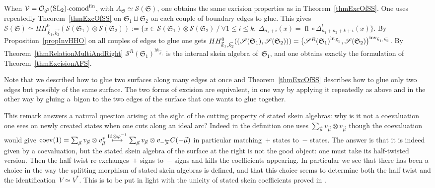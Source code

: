 \documentclass[pdftex]{sigma}%
\numberwithin{equation}{section}
\newcommand{\halft}{{\operatorname{ht}}}
\newcommand{\Oqcomfin}{\Oq\text{-}{\rm comod}^{\rm fin}}
\newcommand{\Oq}{\mathcal{O}_{q^2}({\rm SL}_2)}
\begin{document}
\begin{Remark}
When $\mathcal{V} = \Oqcomfin$, with $A_\mathfrak{S} \simeq \mathscr{S}(\mathfrak{S})$, one obtains the same excision properties as in Theorem~\ref{thmExcOfSS}. One uses repeatedly Theorem~\ref{thmExcOfSS} on $\mathfrak{S}_1\sqcup\mathfrak{S}_2$ on each couple of boundary edges to glue. This gives $\mathscr{S}(\mathfrak{S}) \simeq HH^0_{\vec{k}_1,\vec{k_2}}(\mathscr{S}(\mathfrak{S}_1)\otimes \mathscr{S}(\mathfrak{S}_2)):= \{ x \in \mathscr{S}(\mathfrak{S}_1) \otimes \mathscr{S}(\mathfrak{S}_2)\ /\ \forall 1\leq i\leq k,\ \Delta_{n_1+i}(x) = \operatorname{fl}\circ \Delta^l_{n_1+n_2+k+i}(x)\}$. By Proposition~\ref{propInvHHO} on all couples of edges to glue one gets $HH^0_{\vec{k}_1,\vec{k_2}}((\mathscr{S}(\mathfrak{S}_1), \mathscr{S}(\mathfrak{S}_2)))= \big(\mathscr{S}^R(\mathfrak{S}_1)^{\halft_{\vec{k}_1}} , \mathscr{S}(\mathfrak{S}_2)\big)^{{\rm inv}_{\vec{k}_1,\vec{k_2}}}$. By Theorem~\ref{thmRelationMultiAndRight} $\mathscr{S}^R(\mathfrak{S}_1)^{\halft_{\vec{k}_1}}$ is the internal skein algebra of~$\mathfrak{S}_1$, and one obtains exactly the formulation of Theorem~\ref{thmExcisionAFS}.

Note that we described how to glue two surfaces along many edges at once and Theorem~\ref{thmExcOfSS} describes how to glue only two edges but possibly of the same surface. The two forms of excision are equivalent, in one way by applying it repeatedly as above and in the other way by gluing a~bigon to the two edges of the surface that one wants to glue together.
\end{Remark}

\begin{Remark}\label{rmkChoiceCutting}
This remark answers a natural question arising at the sight of the cutting property of stated skein algebras: why is it not a coevaluation one sees on newly created states when one cuts along an ideal arc? Indeed in the definition one uses $\sum_{\vec{\mu}} v_{\vec{\mu}}\otimes v_{\vec{\mu}}$ though the coevaluation would give $\mathop{\rm coev}(1)= \sum_{\vec{\mu}} v_{\vec{\mu}} \otimes v_{\vec{\mu}}^* \overset{{\rm Id} \otimes \varphi^{-1}}\longmapsto \sum_{\vec{\mu}} v_{\vec{\mu}} \otimes v_{-\overleftarrow{\mu}} C(-\vec{\mu})$ in particular matching~$+$ states to~$-$ states. The answer is that it is indeed given by a coevaluation, but the stated skein algebra of the surface at the right is not the good object: one must take its half-twisted version. Then the half twist re-exchanges~$+$ signs to~$-$ signs and kills the coefficients appearing. In particular we see that there has been a choice in the way the splitting morphism of stated skein algebras is defined, and that this choice seems to determine both the half twist and the identification~$V \simeq V^*$. This is to be put in light with the unicity of stated skein coefficients proved in \cite[Section~3.4]{TTQLe}.
\end{Remark}
\end{document}
